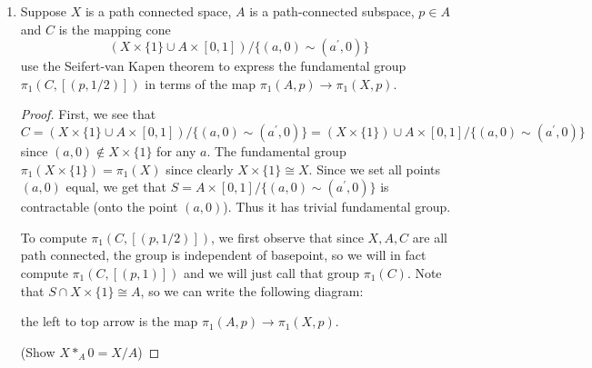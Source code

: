 \documentclass{article}
\newcommand{\Z}{\mathbb{Z}}
\begin{document}
\begin{enumerate}
\begin{proof}
		There are 6 different 4-tuples of quotients who yield the trivial group. The only isomorphism of the trivial group is the trivial map, so
		these contribute +6 to our count of of subgroups.
		There are 2 different 4-tuples of quotients who yield the group $\Z/2$.
		Similarly, there is only one isomorphism from $\Z/2$ to itself.
		Thus, there are 8 subgroups of $\Z/2\times \Z/4$ and so there are 8 isomorphism classes of covering maps $Y \rightarrow X$ 
		with $Y$ being path connected.
		
		\emph{Note:} 6 of the subgroups are of the form $G \times H$ where $G \leq \Z/2$ and $H \leq \Z/4$.
		The two remaining subgrops are 
		
		\[ \langle (1,0) + (1,3) \rangle \]
	\end{proof}
	
	\href{https://math.stackexchange.com/questions/666840/what-are-the-subgroups-of-bbbz-2-times-bbbz-4}{Alternate proof.}
	
	\item Suppose $X$ is a path connected space, $A$ is a path-connected subspace, $p \in A$ and $C$ is the mapping cone
	\[ (X \times \{ 1 \} \cup A\times [0,1])/\{ (a,0) \sim (a^\prime,0)\}\]
	use the Seifert-van Kapen theorem to express the fundamental group $\pi_1(C, [(p,1/2)])$ 
	in terms of the map $\pi_1(A,p) \rightarrow \pi_1(X,p)$.
	
	\begin{proof}
		First, we see that 
		\[C =  (X \times \{ 1 \} \cup A\times [0,1])/\{ (a,0) \sim (a^\prime,0)\} =  (X \times \{ 1 \} ) \cup A\times [0,1] /\{ (a,0) \sim (a^\prime,0)\} \]
		since $(a,0) \not \in X \times \{ 1\}$ for any $a$.
		The fundamental group $\pi_1(X \times \{1 \}) = \pi_1(X)$ since clearly $X \times\{1\} \cong X$.
		Since we set all points $(a,0)$ equal, we get that
		$S = A\times [0,1] /\{ (a,0) \sim (a^\prime,0)\}$ is contractable (onto the point $(a,0)$). Thus it has trivial fundamental group.
		
		To compute $\pi_1(C, [(p,1/2)])$, we first observe that since $X,A,C$ are all path connected, the group is independent of basepoint, so we will 
		in fact compute $\pi_1(C, [(p,1)])$ and we will just call that group $\pi_1(C)$.
		Note that $S \cap X \times \{ 1\} \cong A$, so we can write the following diagram:
		
		
		\noindent the left to top arrow is the map $\pi_1(A, p) \rightarrow \pi_1(X,p)$.
		
		(Show $X*_A0 = X/A$)
		
	\end{proof}
\end{enumerate}
\end{document}
